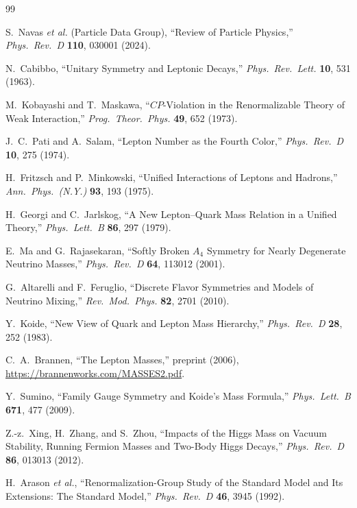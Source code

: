 \documentclass[11pt,a4paper]{article}
\begin{document}
\begin{thebibliography}{99}\small

S.~Navas \textit{et al.} (Particle Data Group), ``Review of Particle Physics,'' \emph{Phys.\ Rev.\ D} \textbf{110}, 030001 (2024).

N.~Cabibbo, ``Unitary Symmetry and Leptonic Decays,'' \emph{Phys.\ Rev.\ Lett.} \textbf{10}, 531 (1963).

M.~Kobayashi and T.~Maskawa, ``$CP$-Violation in the Renormalizable Theory of Weak Interaction,'' \emph{Prog.\ Theor.\ Phys.} \textbf{49}, 652 (1973).

J.~C.~Pati and A.~Salam, ``Lepton Number as the Fourth Color,'' \emph{Phys.\ Rev.\ D} \textbf{10}, 275 (1974).

H.~Fritzsch and P.~Minkowski, ``Unified Interactions of Leptons and Hadrons,'' \emph{Ann.\ Phys.\ (N.Y.)} \textbf{93}, 193 (1975).

H.~Georgi and C.~Jarlskog, ``A New Lepton--Quark Mass Relation in a Unified Theory,'' \emph{Phys.\ Lett.\ B} \textbf{86}, 297 (1979).

E.~Ma and G.~Rajasekaran, ``Softly Broken $A_4$ Symmetry for Nearly Degenerate Neutrino Masses,'' \emph{Phys.\ Rev.\ D} \textbf{64}, 113012 (2001).

G.~Altarelli and F.~Feruglio, ``Discrete Flavor Symmetries and Models of Neutrino Mixing,'' \emph{Rev.\ Mod.\ Phys.} \textbf{82}, 2701 (2010).

Y.~Koide, ``New View of Quark and Lepton Mass Hierarchy,'' \emph{Phys.\ Rev.\ D} \textbf{28}, 252 (1983).

C.~A.~Brannen, ``The Lepton Masses,'' preprint (2006), \url{https://brannenworks.com/MASSES2.pdf}.

Y.~Sumino, ``Family Gauge Symmetry and Koide's Mass Formula,'' \emph{Phys.\ Lett.\ B} \textbf{671}, 477 (2009).

Z.-z.~Xing, H.~Zhang, and S.~Zhou, ``Impacts of the Higgs Mass on Vacuum Stability, Running Fermion Masses and Two-Body Higgs Decays,'' \emph{Phys.\ Rev.\ D} \textbf{86}, 013013 (2012).

H.~Arason \textit{et al.}, ``Renormalization-Group Study of the Standard Model and Its Extensions: The Standard Model,'' \emph{Phys.\ Rev.\ D} \textbf{46}, 3945 (1992).


\end{thebibliography}
\end{document}
